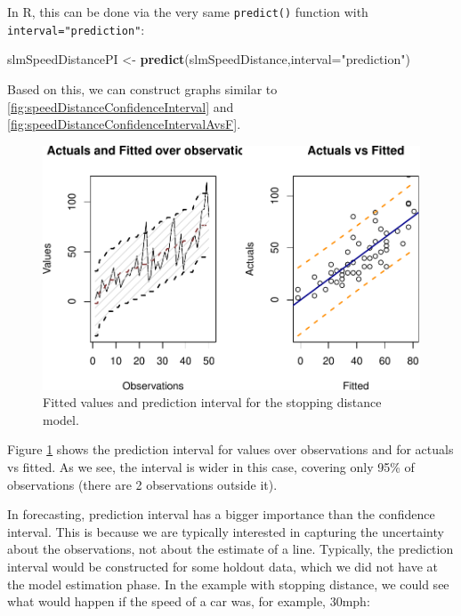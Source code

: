 \documentclass[
]{book}
\newenvironment{Shaded}{\begin{snugshade}}{\end{snugshade}}
\newcommand{\AttributeTok}[1]{\textcolor[rgb]{0.13,0.29,0.53}{#1}}
\newcommand{\FunctionTok}[1]{\textcolor[rgb]{0.13,0.29,0.53}{\textbf{#1}}}
\newcommand{\NormalTok}[1]{#1}
\newcommand{\OtherTok}[1]{\textcolor[rgb]{0.56,0.35,0.01}{#1}}
\newcommand{\StringTok}[1]{\textcolor[rgb]{0.31,0.60,0.02}{#1}}
\theoremstyle{definition}
\theoremstyle{definition}
\theoremstyle{definition}
\theoremstyle{definition}
\theoremstyle{remark}
\begin{document}
In R, this can be done via the very same \texttt{predict()} function with \texttt{interval="prediction"}:

\begin{Shaded}
\begin{Highlighting}[]
\NormalTok{slmSpeedDistancePI }\OtherTok{\textless{}{-}} \FunctionTok{predict}\NormalTok{(slmSpeedDistance,}\AttributeTok{interval=}\StringTok{"prediction"}\NormalTok{)}
\end{Highlighting}
\end{Shaded}

Based on this, we can construct graphs similar to \ref{fig:speedDistanceConfidenceInterval} and \ref{fig:speedDistanceConfidenceIntervalAvsF}.

\begin{figure}
\centering
\includegraphics{Svetunkov---Statistics-for-Business-Analytics_files/figure-latex/speedDistancePI-1.pdf}
\caption{\label{fig:speedDistancePI}Fitted values and prediction interval for the stopping distance model.}
\end{figure}

Figure \ref{fig:speedDistancePI} shows the prediction interval for values over observations and for actuals vs fitted. As we see, the interval is wider in this case, covering only 95\% of observations (there are 2 observations outside it).

In forecasting, prediction interval has a bigger importance than the confidence interval. This is because we are typically interested in capturing the uncertainty about the observations, not about the estimate of a line. Typically, the prediction interval would be constructed for some holdout data, which we did not have at the model estimation phase. In the example with stopping distance, we could see what would happen if the speed of a car was, for example, 30mph:
\end{document}
